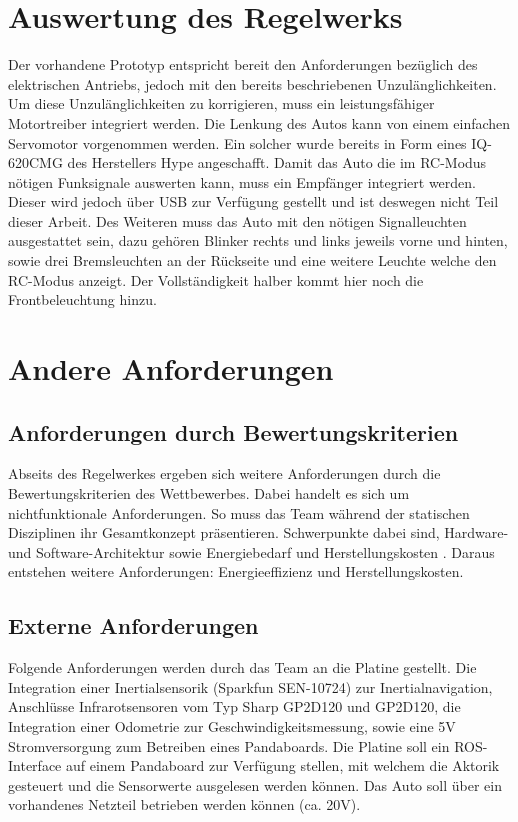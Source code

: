 \section{Auswertung des Regelwerks}
Der vorhandene Prototyp entspricht bereit den Anforderungen bezüglich des elektrischen Antriebs, jedoch mit den bereits beschriebenen Unzulänglichkeiten. 
Um diese Unzulänglichkeiten zu korrigieren, muss ein leistungsfähiger Motortreiber integriert werden.
Die Lenkung des Autos kann von einem einfachen Servomotor vorgenommen werden. Ein solcher wurde bereits in Form eines IQ-620CMG des Herstellers Hype angeschafft. 
Damit das Auto die im RC-Modus nötigen Funksignale auswerten kann, muss ein Empfänger integriert werden. Dieser wird jedoch über USB zur Verfügung gestellt
und ist deswegen nicht Teil dieser Arbeit. Des Weiteren muss das Auto mit den nötigen Signalleuchten ausgestattet sein, dazu gehören Blinker rechts und links
jeweils vorne und hinten, sowie drei Bremsleuchten an der Rückseite und eine weitere Leuchte welche den RC-Modus anzeigt. Der Vollständigkeit halber kommt hier noch die
Frontbeleuchtung hinzu.

\section{Andere Anforderungen}
\subsection{Anforderungen durch Bewertungskriterien}
Abseits des Regelwerkes ergeben sich weitere Anforderungen durch die Bewertungskriterien des Wettbewerbes. Dabei handelt es sich um nichtfunktionale Anforderungen.
So muss das Team während der statischen Disziplinen ihr Gesamtkonzept präsentieren. Schwerpunkte dabei sind, Hardware- und Software-Architektur sowie Energiebedarf und 
Herstellungskosten \cite{website-carolo-cup-regelwerk}. Daraus entstehen weitere Anforderungen: Energieeffizienz und Herstellungskosten. \\


\subsection{Externe Anforderungen}
Folgende Anforderungen werden durch das Team an die Platine gestellt. Die Integration einer Inertialsensorik (Sparkfun SEN-10724) zur Inertialnavigation,
Anschlüsse Infrarotsensoren vom Typ Sharp GP2D120 und GP2D120, die Integration einer Odometrie zur Geschwindigkeitsmessung,
sowie eine 5V Stromversorgung zum Betreiben eines Pandaboards. Die Platine soll ein ROS-Interface auf einem Pandaboard zur Verfügung stellen, mit welchem die Aktorik gesteuert und
die Sensorwerte ausgelesen werden können. Das Auto soll über ein vorhandenes Netzteil betrieben werden können (ca. 20V).\\

